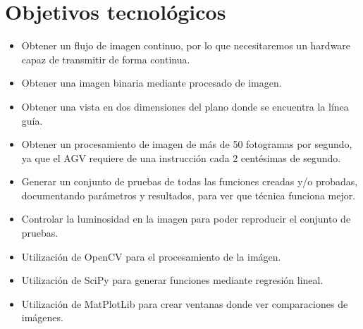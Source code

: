 \section{Objetivos tecnológicos}
\begin{itemize}
	\item Obtener un flujo de imagen continuo, por lo que necesitaremos un hardware capaz de transmitir  de forma continua.

	\item Obtener una imagen binaria mediante procesado de imagen.
	
	\item Obtener una vista en dos dimensiones del plano donde se encuentra la línea guía.
	
	\item Obtener un procesamiento de imagen de más de 50 fotogramas por segundo\cite{fps}, ya que el AGV requiere de una instrucción cada 2 centésimas de segundo.
	
	\item Generar un conjunto de pruebas de todas las funciones creadas y/o probadas, documentando parámetros y resultados, para ver que técnica funciona mejor.
	
	\item Controlar la luminosidad en la imagen para poder reproducir el conjunto de pruebas.
	
	\item Utilización de OpenCV para el procesamiento de la imágen.
	
	\item Utilización de SciPy para generar funciones mediante regresión lineal.
	
	\item Utilización de MatPlotLib para crear ventanas donde ver comparaciones de imágenes.
\end{itemize}
